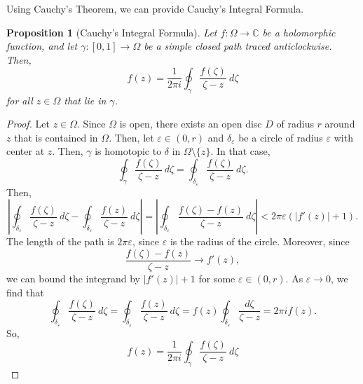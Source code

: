 \documentclass[a4paper, openany]{memoir}
\theoremstyle{definition}
\theoremstyle{plain}
\newtheorem{proposition}[definition]{Proposition}
\begin{document}
Using Cauchy's Theorem, we can provide Cauchy's Integral Formula.
\begin{proposition}[Cauchy's Integral Formula]
Let $f: \Omega \to \mathbb{C}$ be a holomorphic function, and let $\gamma: [0, 1] \to \Omega$ be a simple closed path traced anticlockwise. Then,
\[f(z) = \frac{1}{2\pi i} \oint_\gamma \frac{f(\zeta)}{\zeta - z} \ d\zeta\]
for all $z \in \Omega$ that lie in $\gamma$.
\end{proposition}
\begin{proof}
Let $z \in \Omega$. Since $\Omega$ is open, there exists an open disc $D$ of radius $r$ around $z$ that is contained in $\Omega$. Then, let $\varepsilon \in (0, r)$ and $\delta_\varepsilon$ be a circle of radius $\varepsilon$ with center at $z$. Then, $\gamma$ is homotopic to $\delta$ in $\Omega \setminus \{z\}$. In that case,
\[\oint_\gamma \frac{f(\zeta)}{\zeta - z} \ d\zeta = \oint_{\delta_\varepsilon} \frac{f(\zeta)}{\zeta - z} \ d\zeta.\]
Then,
\[\left|\oint_{\delta_\varepsilon} \frac{f(\zeta)}{\zeta - z} \ d\zeta - \oint_{\delta_\varepsilon} \frac{f(z)}{\zeta - z} \ d\zeta\right| = \left|\oint_{\delta_\varepsilon} \frac{f(\zeta) - f(z)}{\zeta - z} \ d\zeta\right| < 2\pi \varepsilon (|f'(z)| + 1).\]
The length of the path is $2\pi \varepsilon$, since $\varepsilon$ is the radius of the circle. Moreover, since
\[\frac{f(\zeta) - f(z)}{\zeta - z} \to f'(z),\]
we can bound the integrand by $|f'(z)| + 1$ for some $\varepsilon \in (0, r)$. As $\varepsilon \to 0$, we find that
\[\oint_{\delta_\varepsilon} \frac{f(\zeta)}{\zeta - z} \ d\zeta = \oint_{\delta_\varepsilon} \frac{f(z)}{\zeta - z} \ d\zeta = f(z) \oint_{\delta_\varepsilon} \frac{d\zeta}{\zeta - z} = 2\pi i f(z).\]
So,
\[f(z) = \frac{1}{2\pi i} \oint_\gamma \frac{f(\zeta)}{\zeta - z} \ d\zeta\]
\end{proof}
\end{document}

